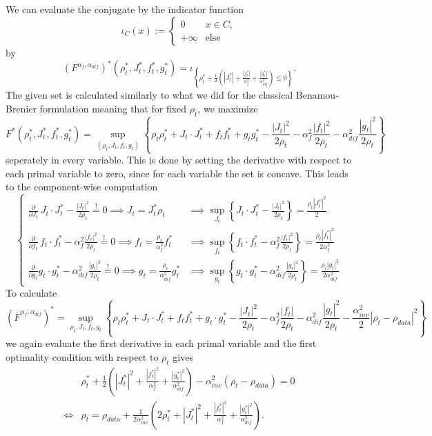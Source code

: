  We can evaluate the conjugate by the indicator function
 $$
	 \iota_C(x) := \begin{cases} 0& x\in C,\\+\infty&\text{else}\end{cases}
 $$
 by 
 $$
 (F^{\alpha_f,\alpha_{dif}})^*(\rho_t^*, J_t^*, f_t^*, g_t^*) = \iota_{\left\{\rho_t^* + \frac{1}{2}\left(|J_t^*| + \frac{|f_t^*|}{\alpha_f^2} + \frac{|g_t^*|}{\alpha_{dif}^2}\right) \leq 0\right\}}.
 $$
 The given set is calculated similarly to what we did for the classical Benamou-Brenier formulation meaning that %
 for fixed $\rho_t$, we maximize
 $$
 F^*(\rho_t^*, J_t^*, f_t^*, g_t^*) = \sup_{(\rho_t, J_t, f_t, g_t)} \left\{\rho_t\rho_t^* + J_t \cdot J_t^* + f_tf_t^*+ g_tg_t^* - \frac{|J_t|^2}{2\rho_t} - \alpha_f^2\frac{|f_t|^2}{2\rho_t} - \alpha_{dif}^2\frac{|g_t|^2}{2\rho_t}\right\}
 $$
 seperately in every variable. This is done by setting the derivative with respect to each primal variable to zero, since for each variable the set is concave. This leads to the component-wise computation
 $$
	 \begin{cases} \frac{\partial}{\partial J_t}\,J_t \cdot J_t^* - \frac{|J_t|^2}{2\rho_t} \overset{!}{=} 0 \implies J_t = J_t^*\rho_t &\implies \sup_{J_t}\left\{ J_t \cdot J_t^* - \frac{|J_t|^2}{2\rho_t}\right\} = \frac{\rho_t|J_t^*|^2}{2}\\
	 \frac{\partial}{\partial f_t}\, f_t \cdot f_t^* - \alpha_f^2\frac{|f_t|^2}{2\rho_t} \overset{!}{=} 0 \implies f_t = \frac{\rho_t}{\alpha_f^2}f_t^*&\implies \sup_{f_t}\left\{ f_t \cdot f_t^* - \alpha_f^2\frac{|f_t|^2}{2\rho_t}\right\} = \frac{\rho_t|f_t^*|^2}{2\alpha_f^2}\\
 \frac{\partial}{\partial g_t} g_t \cdot g_t^* - \alpha_{dif}^2\frac{|g_t|^2}{2\rho_t} \overset{!}{=} 0 \implies g_t = \frac{\rho_t}{\alpha_{dif}^2}g_t^* &\implies \sup_{g_t}\left\{ g_t\cdot g_t^* - \alpha_{dif}^2\frac{|g_t|^2}{2\rho_t}\right\} = \frac{\rho_t |g_t|^2}{2\alpha_{dif}^2}\end{cases}
 $$
 To calculate 
 $$
 (\overline{F}^{\alpha_f, \alpha_{dif}})^*%
 = \sup_{\rho_t, J_t, f_t, g_t} 
 \left\{ \rho_t\rho_t^* + J_t \cdot J_t^* + f_tf_t^* + g_t\cdot g_t^* - \frac{|J_t|^2}{2\rho_t} - \alpha_f^2\frac{|f_t|}{2\rho_t} - \alpha_{dif}^2\frac{|g_t|^2}{2\rho_t} - \frac{\alpha_{inv}^2}{2} |\rho_t - \rho_{data}|^2 \right\} 
 $$ we again evaluate the first derivative in each primal variable and the first optimality condition with respect to $\rho_t$ gives
 \begin{align*}
 &\rho_t^* + \frac{1}{2}\left( |J_t^*|^2 + \frac{|f_t^*|^2}{\alpha_f^2} + \frac{|g_t^*|^2}{\alpha_{dif}^2} \right) - \alpha_{inv}^2(\rho_t - \rho_{data}) = 0\\
	 \iff&\rho_t = \rho_{data} + \frac{1}{2\alpha_{inv}^2}\left(2\rho_t^* + |J_t^*|^2 + \frac{|f_t^*|^2}{\alpha_f^2} + \frac{|g_t^*|^2}{\alpha_{dif}^2}\right).
\end{align*}


